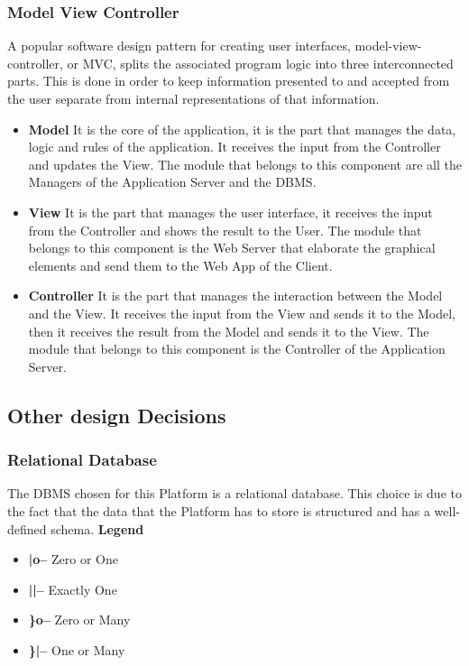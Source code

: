\subsubsection{Model View Controller}
A popular software design pattern for creating user interfaces, model-view-controller, or MVC, splits the associated program logic into three interconnected parts. This is done in order to keep information presented to and accepted 
from the user separate from internal representations of that information.
\begin{itemize}
    \item \textbf{Model} It is the core of the application, it is the part that manages the data, logic and rules of the application. It receives the input from the Controller and updates the View. The module that belongs to this component
    are all the Managers of the Application Server and the DBMS.
    \item \textbf{View} It is the part that manages the user interface, it receives the input from the Controller and shows the result to the User. The module that belongs to this component is the Web Server that elaborate the graphical
    elements and send them to the Web App of the Client.
    \item \textbf{Controller} It is the part that manages the interaction between the Model and the View. It receives the input from the View and sends it to the Model, then it receives the result from the Model and sends it to the View.
    The module that belongs to this component is the Controller of the Application Server.
\end{itemize}

\subsection{Other design Decisions}
\subsubsection{Relational Database}
The DBMS chosen for this Platform is a relational database. This choice is due to the fact that the data that the Platform has to store is structured and has a well-defined schema.
\textbf{Legend}
\begin{itemize}
    \item \textbf{|o--} Zero or One
    \item \textbf{||--} Exactly One
    \item \textbf{\}o--} Zero or Many
    \item \textbf{\}|--} One or Many
\end{itemize}

